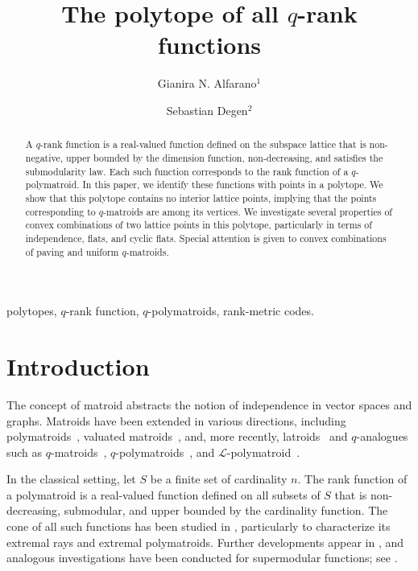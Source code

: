 \documentclass[a4paper,11pt,reqno]{amsart}
\title{The polytope of all $q$-rank functions}
\author[G. N. Alfarano]{Gianira N. Alfarano$^{1}$}
\author[S. Degen]{Sebastian Degen$^2$}
\theoremstyle{definition}
\newcommand{\mL}{\mathcal{L}}
\begin{document}
\begin{abstract}
    A $q$-rank function is a real-valued function defined on the subspace lattice that is non-negative, upper bounded by the dimension function, non-decreasing, and satisfies the submodularity law. Each such function corresponds to the rank function of a $q$-polymatroid. In this paper, we identify these functions with points in a polytope. We show that this polytope contains no interior lattice points, implying that the points corresponding to $q$-matroids are among its vertices. We investigate several properties of convex combinations of two lattice points in this polytope, particularly in terms of independence, flats, and cyclic flats. Special attention is given to convex combinations of paving and uniform $q$-matroids.
\end{abstract}


\maketitle
{} polytopes, $q$-rank function, $q$-polymatroids, rank-metric codes.

\section{Introduction}
The concept of matroid abstracts the notion of independence in vector spaces and graphs. Matroids have been extended in various directions, including polymatroids~\cite{edmonds2003submodular}, valuated matroids~\cite{dress1992valuated}, and, more recently, latroids~\cite{vertigan2004latroids, gorla2025latroids} and $q$-analogues such as $q$-matroids~\cite{jurrius2018defining}, $q$-polymatroids~\cite{gorla2019rank, shiromoto2019codes}, and $\mL$-polymatroid~\cite{alfarano2023critical, byrne2023cyclic}.

In the classical setting, let $S$ be a finite set of cardinality $n$. The rank function of a polymatroid is a real-valued function defined on all subsets of $S$ that is non-decreasing, submodular, and upper bounded by the cardinality function. The cone of all such functions has been studied in \cite{nguyen1978semimodular}, particularly to characterize its extremal rays and extremal polymatroids. Further developments appear in \cite{girlich1995cone, kashiwabara2000extremality}, and analogous investigations have been conducted for supermodular functions; see \cite{grabisch2019cone}.
\end{document}
